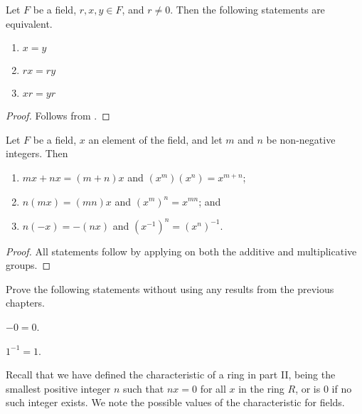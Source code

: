 \begin{proposition}
    Let $F$ be a field, $r, x, y \in F$, and $r \neq 0$. Then the following statements are equivalent.
    \begin{enumerate}
        \item $x = y$
        \item $rx = ry$
        \item $xr = yr$
    \end{enumerate}
\end{proposition}
\begin{proof}
    Follows from .
\end{proof}

\newpage

\begin{proposition}
    Let $F$ be a field, $x$ an element of the field, and let $m$ and $n$ be non-negative integers. Then
    \begin{enumerate}
        \item $mx + nx = (m+n)x$ and $(x^m)(x^n) = x^{m+n}$;
        \item $n(mx) = (mn)x$ and $(x^m)^n = x^{mn}$; and
        \item $n(-x) = -(nx)$ and $(x^{-1})^n = (x^n)^{-1}$.
    \end{enumerate}
\end{proposition}
\begin{proof}
    All statements follow by applying  on both the additive and multiplicative groups.
\end{proof}

\begin{exercise}\label{exercise-inverse-of-additive-and-multiplicative-identities-are-themselves}
    Prove the following statements without using any results from the previous chapters.
    \begin{partquestions}{\alph*}
        \item $-0 = 0$.
        \item $1^{-1} = 1$.
    \end{partquestions}
\end{exercise}

Recall that we have defined the characteristic of a ring in part II, being the smallest positive integer $n$ such that $nx = 0$ for all $x$ in the ring $R$, or is 0 if no such integer exists. We note the possible values of the characteristic for fields.

